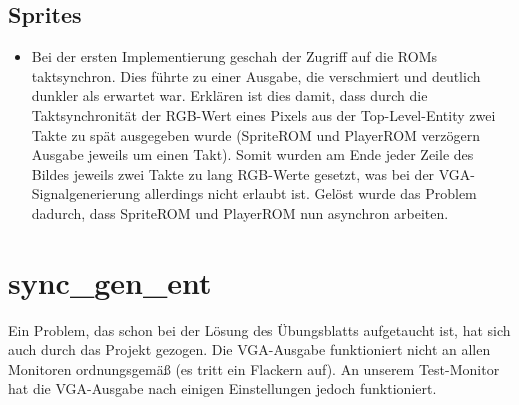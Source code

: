 \documentclass[parskip=full]{scrartcl}
\begin{document}
			\subsection{Sprites}
				\begin{itemize}
					\item Bei der ersten Implementierung geschah der Zugriff auf die ROMs taktsynchron. Dies führte zu einer Ausgabe, die verschmiert und deutlich dunkler als erwartet war. Erklären ist dies damit, dass durch die Taktsynchronität der RGB-Wert eines Pixels aus der Top-Level-Entity zwei Takte zu spät ausgegeben wurde (SpriteROM und PlayerROM verzögern Ausgabe jeweils um einen Takt). Somit wurden am Ende jeder Zeile des Bildes jeweils zwei Takte zu lang RGB-Werte gesetzt, was bei der VGA-Signalgenerierung allerdings nicht erlaubt ist.
					Gelöst wurde das Problem dadurch, dass SpriteROM und PlayerROM nun asynchron arbeiten.
				\end{itemize}
	
		
		\section{sync\_gen\_ent}
			Ein Problem, das schon bei der Lösung des Übungsblatts aufgetaucht ist, hat sich auch durch das Projekt gezogen.
			Die VGA-Ausgabe funktioniert nicht an allen Monitoren ordnungsgemäß (es tritt ein Flackern auf). An unserem Test-Monitor hat die VGA-Ausgabe nach einigen Einstellungen jedoch funktioniert.
\end{document}
